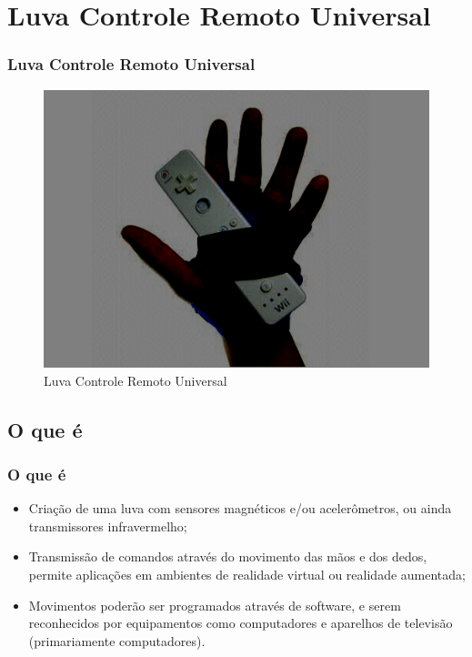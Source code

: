 \documentclass[hyperref={pdfpagelabels=false}]{beamer}
\begin{document}
    \section{Luva Controle Remoto Universal}

        \begin{frame}\frametitle{Luva Controle Remoto Universal}

            \begin{figure}
                \includegraphics[scale=0.5]{Imagens/Ideia_de_projeto/luva.png}
                \caption{Luva Controle Remoto Universal}
            \end{figure}

        \end{frame}

        \subsection{O que é}

             \begin{frame}\frametitle{O que é}

                \begin{itemize}
                    \item Criação de uma luva com sensores magnéticos e/ou acelerômetros, ou ainda transmissores infravermelho;
                    \item Transmissão de comandos através do movimento das mãos e dos dedos, permite aplicações em ambientes de realidade virtual ou realidade aumentada;
                    \item Movimentos poderão ser programados através de software, e serem reconhecidos por equipamentos como computadores e aparelhos de televisão (primariamente computadores).
                \end{itemize}

            \end{frame}
\end{document}
